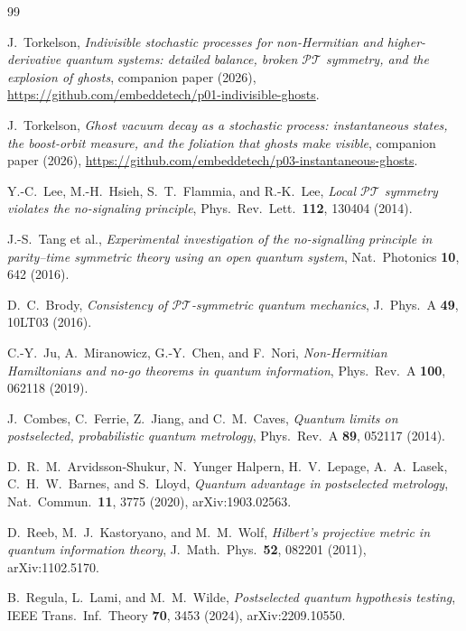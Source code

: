 \documentclass[11pt]{article}
\theoremstyle{remark}
\newcommand{\PT}{\mathcal{PT}}
\begin{document}
\begin{thebibliography}{99}\small

J.~Torkelson,
\emph{Indivisible stochastic processes for non-Hermitian and
higher-derivative quantum systems: detailed balance, broken $\PT$
symmetry, and the explosion of ghosts},
companion paper (2026),
\url{https://github.com/embeddetech/p01-indivisible-ghosts}.

J.~Torkelson,
\emph{Ghost vacuum decay as a stochastic process: instantaneous
states, the boost-orbit measure, and the foliation that ghosts make
visible},
companion paper (2026),
\url{https://github.com/embeddetech/p03-instantaneous-ghosts}.

Y.-C.~Lee, M.-H.~Hsieh, S.~T.~Flammia, and R.-K.~Lee,
\emph{Local $\PT$ symmetry violates the no-signaling principle},
Phys.\ Rev.\ Lett.\ \textbf{112}, 130404 (2014).

J.-S.~Tang et al.,
\emph{Experimental investigation of the no-signalling principle in
parity--time symmetric theory using an open quantum system},
Nat.\ Photonics \textbf{10}, 642 (2016).

D.~C.~Brody,
\emph{Consistency of $\PT$-symmetric quantum mechanics},
J.\ Phys.\ A \textbf{49}, 10LT03 (2016).

C.-Y.~Ju, A.~Miranowicz, G.-Y.~Chen, and F.~Nori,
\emph{Non-Hermitian Hamiltonians and no-go theorems in quantum
information},
Phys.\ Rev.\ A \textbf{100}, 062118 (2019).

J.~Combes, C.~Ferrie, Z.~Jiang, and C.~M.~Caves,
\emph{Quantum limits on postselected, probabilistic quantum
metrology},
Phys.\ Rev.\ A \textbf{89}, 052117 (2014).

D.~R.~M.~Arvidsson-Shukur, N.~Yunger Halpern, H.~V.~Lepage,
A.~A.~Lasek, C.~H.~W.~Barnes, and S.~Lloyd,
\emph{Quantum advantage in postselected metrology},
Nat.\ Commun.\ \textbf{11}, 3775 (2020), arXiv:1903.02563.

D.~Reeb, M.~J.~Kastoryano, and M.~M.~Wolf,
\emph{Hilbert's projective metric in quantum information theory},
J.\ Math.\ Phys.\ \textbf{52}, 082201 (2011), arXiv:1102.5170.

B.~Regula, L.~Lami, and M.~M.~Wilde,
\emph{Postselected quantum hypothesis testing},
IEEE Trans.\ Inf.\ Theory \textbf{70}, 3453 (2024), arXiv:2209.10550.


\end{thebibliography}
\end{document}
